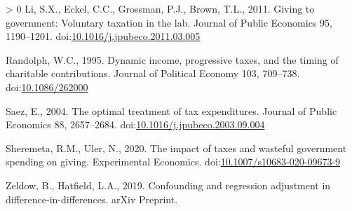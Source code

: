 \documentclass[ review  , 3p ]{elsarticle}
\newlength{\cslhangindent}
\newenvironment{CSLReferences}[3] %
 {%
  \setlength{\parindent}{0pt}
  \ifodd #1 \everypar{\setlength{\hangindent}{\cslhangindent}}\ignorespaces\fi
  \ifnum #2 > 0
  \setlength{\parskip}{#2\baselineskip}
  \fi
 }%
 {}
\begin{document}
\begin{CSLReferences}{1}{0}
  \leavevmode\hypertarget{ref-Li2011}{}%
  Li, S.X., Eckel, C.C., Grossman, P.J., Brown, T.L., 2011. Giving to government: Voluntary taxation in the lab. Journal of Public Economics 95, 1190--1201. doi:\href{https://doi.org/10.1016/j.jpubeco.2011.03.005}{10.1016/j.jpubeco.2011.03.005}

  \leavevmode\hypertarget{ref-Randolph1995}{}%
  Randolph, W.C., 1995. Dynamic income, progressive taxes, and the timing of charitable contributions. Journal of Political Economy 103, 709--738. doi:\href{https://doi.org/10.1086/262000}{10.1086/262000}

  \leavevmode\hypertarget{ref-Saez2004}{}%
  Saez, E., 2004. The optimal treatment of tax expenditures. Journal of Public Economics 88, 2657--2684. doi:\href{https://doi.org/10.1016/j.jpubeco.2003.09.004}{10.1016/j.jpubeco.2003.09.004}

  \leavevmode\hypertarget{ref-Sheremeta2020}{}%
  Sheremeta, R.M., Uler, N., 2020. The impact of taxes and wasteful government spending on giving. Experimental Economics. doi:\href{https://doi.org/10.1007/s10683-020-09673-9}{10.1007/s10683-020-09673-9}

  \leavevmode\hypertarget{ref-Zeldow2019}{}%
  Zeldow, B., Hatfield, L.A., 2019. Confounding and regression adjustment in difference-in-differences. arXiv Preprint.

  \end{CSLReferences}
\end{document}

